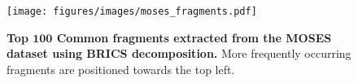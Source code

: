 \begin{figure}[h!]
    \centering
    \texttt{[image: figures/images/moses\_fragments.pdf]}
    \caption{\textbf{Top $\textbf{100}$ Common fragments extracted from the MOSES dataset using BRICS decomposition.} More frequently occurring fragments are positioned towards the top left.}
    \label{fig:moses_fragments}
\end{figure}